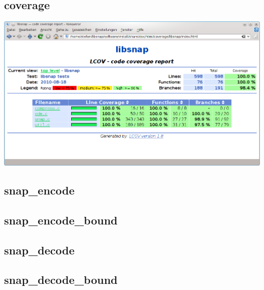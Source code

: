 \subsection{coverage}
\begin{frame}[fragile]
\begin{center}
\includegraphics[scale=0.4]{images/lcov_1.png}
\end{center}
\end{frame}

\subsection{snap\_encode}
\begin{frame}[fragile]

\end{frame}


\subsection{snap\_encode\_bound}
\begin{frame}[fragile]

\end{frame}


\subsection{snap\_decode}
\begin{frame}[fragile]

\end{frame}


\subsection{snap\_decode\_bound}
\begin{frame}[fragile]

\end{frame}


